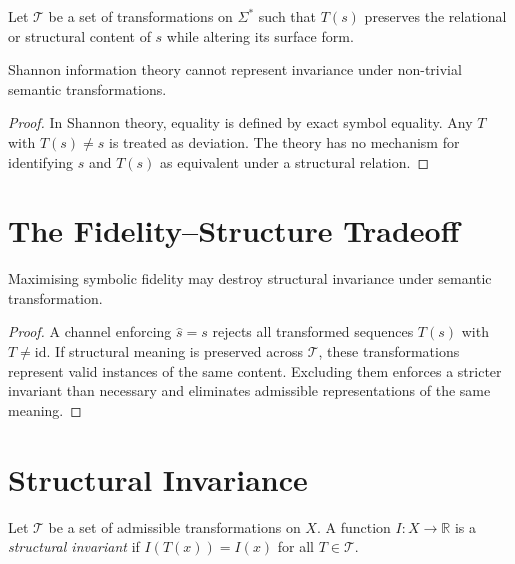 \documentclass[11pt,openany]{book}
\begin{document}
\begin{definition}
Let $\mathcal{T}$ be a set of transformations on $\Sigma^*$
such that $T(s)$ preserves the relational or structural
content of $s$ while altering its surface form.
\end{definition}

\begin{proposition}
\label{prop:semantic}
Shannon information theory cannot represent invariance under
non-trivial semantic transformations.
\end{proposition}

\begin{proof}
In Shannon theory, equality is defined by exact symbol
equality. Any $T$ with $T(s) \neq s$ is treated as
deviation. The theory has no mechanism for identifying $s$
and $T(s)$ as equivalent under a structural relation.
\end{proof}

\section{The Fidelity--Structure Tradeoff}
\label{sec:cost-fidelity}

\begin{proposition}
Maximising symbolic fidelity may destroy structural
invariance under semantic transformation.
\end{proposition}

\begin{proof}
A channel enforcing $\hat{s} = s$ rejects all transformed
sequences $T(s)$ with $T \neq \mathrm{id}$. If structural
meaning is preserved across $\mathcal{T}$, these
transformations represent valid instances of the same
content. Excluding them enforces a stricter invariant than
necessary and eliminates admissible representations of the
same meaning.
\end{proof}

\section{Structural Invariance}
\label{sec:structural-invariance}

\begin{definition}
Let $\mathcal{T}$ be a set of admissible transformations on
$X$. A function $I : X \to \mathbb{R}$ is a
\emph{structural invariant} if $I(T(x)) = I(x)$ for all
$T \in \mathcal{T}$.
\end{definition}
\end{document}
